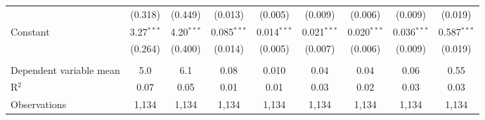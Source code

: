 \begin{adjustbox}{width = \textwidth, center}
\begin{tabular}{lcccccccc}
                              & (0.318)       & (0.449)       & (0.013)       & (0.005)       & (0.009)                & (0.006)                & (0.009)       & (0.019)\\   
      Constant                & 3.27$^{***}$  & 4.20$^{***}$  & 0.085$^{***}$ & 0.014$^{***}$ & 0.021$^{***}$          & 0.020$^{***}$          & 0.036$^{***}$ & 0.587$^{***}$\\   
                              & (0.264)       & (0.400)       & (0.014)       & (0.005)       & (0.007)                & (0.006)                & (0.009)       & (0.019)\\   
       \\
      Dependent variable mean & 5.0           & 6.1           & 0.08          & 0.010         & 0.04                   & 0.04                   & 0.06          & 0.55\\  
      R$^2$                   & 0.07          & 0.05          & 0.01          & 0.01          & 0.03                   & 0.02                   & 0.03          & 0.03\\  
      Observations            & 1,134         & 1,134         & 1,134         & 1,134         & 1,134                  & 1,134                  & 1,134         & 1,134\\  
      \bottomrule
   \end{tabular}
\end{adjustbox}
\par\endgroup


